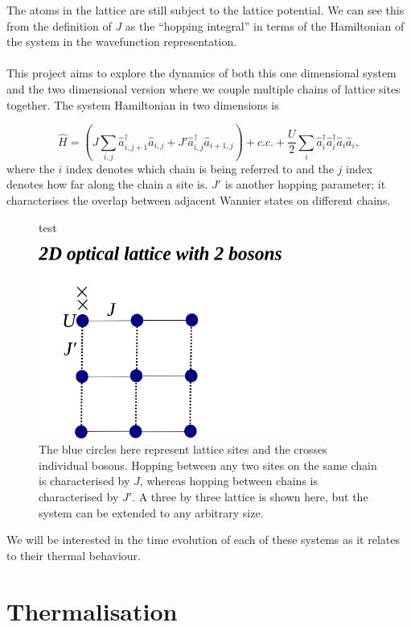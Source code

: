 \documentclass[a4paper,10pt]{article}
\begin{document}
The atoms in the lattice are still subject to the lattice potential. We can see this from the definition of $J$ as the ``hopping integral'' in terms of the Hamiltonian of
the system in the wavefunction representation.
\\\\
This project aims to explore the dynamics of both this one dimensional system and the two dimensional version where we couple multiple chains of lattice sites together. The 
system Hamiltonian in two dimensions is
 
\begin{equation}
\hat{H}=(J\sum_{i,j}\hat{a}^\dagger_{i,j+1}\hat{a}_{i,j} + J'\hat{a}^\dagger_{i,j}\hat{a}_{i+1,j})+c.c. +\frac{U}{2}\sum_{i}\hat{a}^\dagger_{i}\hat{a}^\dagger_{i}\hat{a}_{i}\hat{a}_{i},
\end{equation}
where the $i$ index denotes which chain is being referred to and the $j$ index denotes how far along the chain a site is. $J'$ is another hopping parameter; it characterises the 
overlap between adjacent Wannier states on different chains.
\begin{figure}[H]
 \caption[short]{test}
 \includegraphics[width=8cm]{lattice_pic}
 \centering
 \caption*{The blue circles here represent lattice sites and the crosses individual bosons. Hopping between any two sites on the same chain is characterised by $J$, whereas hopping 
 between chains is characterised by $J'$. A three by three lattice is shown here, but the system can be extended to any arbitrary size.}
 \end{figure}

 
We will be interested in the time evolution of each of these systems as it relates to their thermal behaviour.


\section{Thermalisation}
\end{document}
